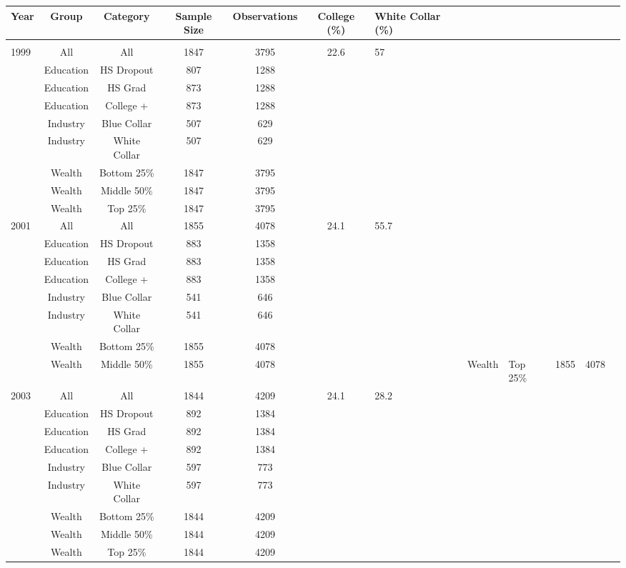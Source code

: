   \begin{tabular}{||l|c|c|c|c|c||}
    Year & Group & Category & Sample Size & Observations & College (\%) & White Collar (\%) \\
    \hline\hline \\
    1999 & All & All & 1847 & 3795 & 22.6 & 57 \\
    & Education & HS Dropout & 807 & 1288 & & \\
    & Education & HS Grad & 873 & 1288 & & \\
    & Education & College + & 873 & 1288 & & \\
    & Industry & Blue Collar & 507 & 629 & & \\
    & Industry & White Collar & 507 & 629 & & \\
    & Wealth & Bottom 25\% & 1847 & 3795 & & \\
    & Wealth & Middle 50\% & 1847 & 3795 & & \\
    & Wealth & Top 25\% & 1847 & 3795 & & \\
    2001 & All & All & 1855 & 4078 & 24.1 & 55.7 \\
    & Education & HS Dropout & 883 & 1358 & & \\
    & Education & HS Grad & 883 & 1358 & & \\
    & Education & College + & 883 & 1358 & & \\
    & Industry & Blue Collar & 541 & 646 & & \\
    & Industry & White Collar & 541 & 646 & & \\
    & Wealth & Bottom 25\% & 1855 & 4078 & & \\
    & Wealth & Middle 50\% & 1855 & 4078 & &
    & Wealth & Top 25\% & 1855 & 4078 & & \\
    2003 & All & All & 1844 & 4209 & 24.1 & 28.2 \\
    & Education & HS Dropout & 892 & 1384 & & \\
    & Education & HS Grad & 892 & 1384 & & \\
    & Education & College + & 892 & 1384 & & \\
    & Industry & Blue Collar & 597 & 773 & & \\
    & Industry & White Collar & 597 & 773 & & \\
    & Wealth & Bottom 25\% & 1844 & 4209 & & \\
    & Wealth & Middle 50\% & 1844 & 4209 & & \\
    & Wealth & Top 25\% & 1844 & 4209 & & \\

\end{tabular}
